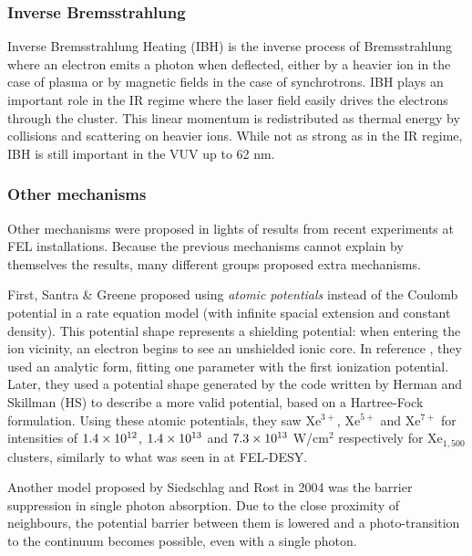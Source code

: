 \subsubsection{Inverse Bremsstrahlung}
Inverse Bremsstrahlung Heating (IBH) is the inverse process of Bremsstrahlung
where an electron emits a photon when deflected, either by a heavier ion in the
case of plasma or by magnetic fields in the case of synchrotrons. IBH plays an
important role in the IR regime\cite{Fennel2010} where the laser field easily
drives the electrons through the cluster. This linear momentum is redistributed
as thermal energy by collisions and scattering on heavier ions. While not as
strong as in the IR regime, IBH is still important in the VUV\cite{Krainov2000}
up to 62 nm\cite{Georgescu2007}.




\subsubsection{Other mechanisms}
Other mechanisms were proposed in lights of results from recent experiments at
FEL installations\cite{Wabnitz2002}. Because the previous mechanisms cannot
explain by themselves
the results, many different groups proposed extra mechanisms.


First, Santra \& Greene proposed using \textit{atomic potentials} instead of
the Coulomb potential in a rate equation model (with infinite spacial
extension and
constant density). This potential shape represents a shielding potential: when
entering the ion vicinity, an electron begins to see an unshielded ionic core.
In reference \cite{Greene2003}, they used an analytic form, fitting one
parameter
with the first ionization potential. Later\cite{Walters2006}, they used a
potential shape generated by the code written by Herman and
Skillman\cite{HS1963} (HS) to describe a more valid potential, based on a
Hartree-Fock formulation. Using these atomic potentials, they saw Xe$^{3+}$,
Xe$^{5+}$ and Xe$^{7+}$ for intensities of $\ten{1.4}{12}$, $\ten{1.4}{13}$ and
$\ten{7.3}{13}$ W/cm$^2$ respectively for Xe$_{1,500}$ clusters, similarly to
what was seen in at FEL-DESY.

Another model proposed by Siedschlag and Rost\cite{Siedschlag2004} in 2004 was
the barrier suppression in single photon absorption. Due to the close proximity
of neighbours, the potential barrier between them is lowered and
a photo-transition to the continuum becomes possible, even with a single photon.

